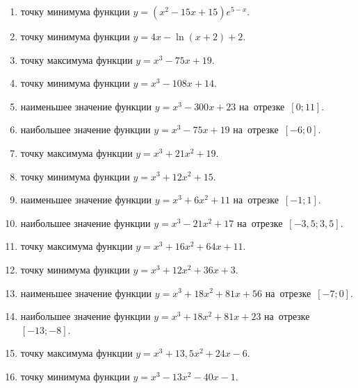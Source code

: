 \documentclass[a4paper,10pt]{article}
\begin{document}
\begin{enumerate}
\item {} точку минимума функции $y=\left(x^2-15x+15\right){{e}^{5-x}}$.

\item {} точку минимума функции $y=4x-\ln \left(x+2\right)+2$.

\item {} точку максимума функции $y=x^3 -75x +19$.

\item {} точку минимума функции $y=x^3 -108x+14$.

\item {} наименьшее значение функции $y=x^3 -300x+23$ на~отрезке~$\left[0;11\right]$.

\item {} наибольшее значение функции $y=x^3 -75x+19$ на~отрезке~$\left[-6;0\right]$.

\item {} точку максимума функции $y=x^3 +21x^2+19$.

\item {} точку минимума функции $y=x^3 +12x^2+15$.

\item {} наименьшее значение функции $y=x^3 +6x^2+11$ на~отрезке~$\left[-1;1\right]$.

\item {} наибольшее значение функции $y=x^3 -21x^2+17$ на~отрезке~$\left[-3,5;3,5\right]$.

\item {} точку максимума функции $y=x^3 +16x^2+64x+11$.

\item {} точку минимума функции $y=x^3 +12x^2+36x+3$.

\item {} наименьшее значение функции $y=x^3 +18x^2+81x+56$ на~отрезке~$\left[-7;0\right]$.

\item {} наибольшее значение функции $y=x^3 +18x^2+81x+23$ на~отрезке~$\left[-13;-8\right]$.

\item {} точку максимума функции $y=x^3 +13,5x^2+24x-6$.

\item {} точку минимума функции $y=x^3 -13x^2-40x-1$.


\end{enumerate}
\end{document}
